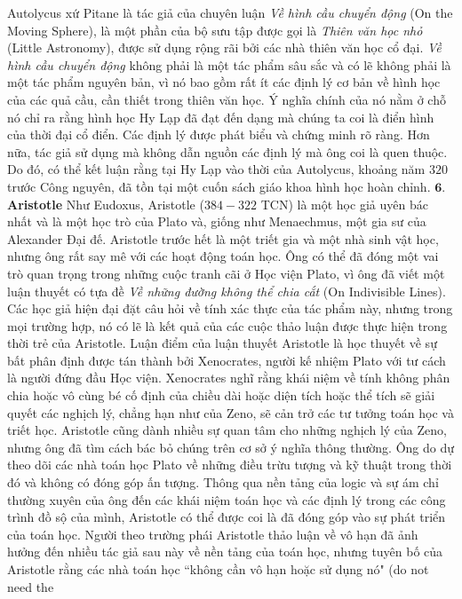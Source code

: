 \begin{multicols}{2}
	Autolycus xứ Pitane là tác giả của chuyên luận \textit{Về hình cầu chuyển động} (On the Moving Sphere), là một phần của bộ sưu tập được gọi là \textit{Thiên văn học nhỏ} (Little Astronomy), được sử dụng rộng rãi bởi các nhà thiên văn học cổ đại. \textit{Về hình cầu chuyển động} không phải là một tác phẩm sâu sắc và có lẽ không phải là một tác phẩm nguyên bản, vì nó bao gồm rất ít các định lý cơ bản về hình học của các quả cầu, cần thiết trong thiên văn học. Ý nghĩa chính của nó nằm ở chỗ nó chỉ ra rằng hình học Hy Lạp đã đạt đến dạng mà chúng ta coi là điển hình của thời đại cổ điển. Các định lý được phát biểu và chứng minh rõ ràng. Hơn nữa, tác giả sử dụng mà không  dẫn nguồn các định lý mà ông coi là quen thuộc. Do đó, có thể kết luận rằng tại Hy Lạp vào thời của Autolycus, khoảng năm $320$ trước Công nguyên, đã tồn tại một cuốn sách giáo khoa hình học hoàn chỉnh. 
	\vskip 0.1cm
	$\pmb{6.}$ \textbf{\color{lichsutoanhoc}Aristotle} 
	\vskip 0.1cm
	Như Eudoxus, Aristotle ($384-322$ TCN) là một học giả uyên bác nhất và là một học trò của Plato và, giống như Menaechmus, một gia sư của Alexander Đại đế. 
	\vskip 0.1cm
	Aristotle trước hết là một triết gia và một nhà sinh vật học, nhưng ông rất say mê với các hoạt động toán học. 
	\vskip 0.1cm
	Ông có thể đã đóng một vai trò quan trọng trong những cuộc tranh cãi ở Học viện Plato, vì ông đã viết một luận thuyết có tựa đề \textit{Về những đường không thể chia cắt} (On Indivisible Lines). Các học giả hiện đại đặt câu hỏi về tính xác thực của tác phẩm này, nhưng trong mọi trường hợp, nó có lẽ là kết quả của các cuộc thảo luận được thực hiện trong thời trẻ của Aristotle. 
	\vskip 0.1cm
	Luận điểm của luận thuyết Aristotle là học thuyết về sự bất phân định được tán thành bởi Xenocrates, người kế nhiệm Plato với tư cách là người đứng đầu Học viện.  
	\vskip 0.1cm
	Xenocrates nghĩ rằng khái niệm về tính không phân chia hoặc vô cùng bé cố định của chiều dài hoặc diện tích hoặc thể tích sẽ giải quyết các nghịch lý, chẳng hạn như của Zeno, sẽ cản trở các tư tưởng toán học và triết học. 
	\vskip 0.1cm
	Aristotle cũng dành nhiều sự quan tâm cho những nghịch lý của Zeno, nhưng ông đã tìm cách bác bỏ chúng trên cơ sở ý nghĩa thông thường. Ông do dự theo dõi các nhà toán học Plato về những điều trừu tượng và kỹ thuật trong thời đó và không có đóng góp ấn tượng. 
	\vskip 0.1cm
	Thông qua nền tảng của logic và sự ám chỉ thường xuyên của ông đến các khái niệm toán học và các định lý trong các công trình đồ sộ của mình, Aristotle có thể được coi là đã đóng góp vào sự phát triển của toán học. 
	\vskip 0.1cm
	Người theo trường phái Aristotle thảo luận về vô hạn đã ảnh hưởng đến nhiều tác giả sau này về nền tảng của toán học, nhưng tuyên bố của Aristotle rằng các nhà toán học ``không cần vô hạn hoặc sử dụng nó" (do not need the

\end{multicols}
